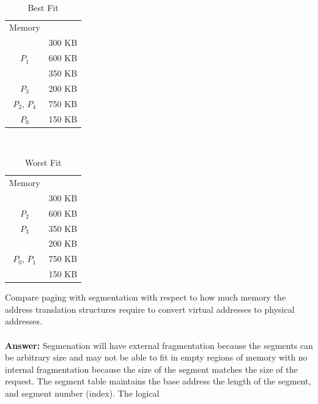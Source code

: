 \documentclass[12pt]{article}
\begin{document}
\\
\begin{table}[htb]
\centering
\caption{Best Fit}
\begin{tabular}{|c|c}
\cline{1-1}
Memory      &                               \\ \cline{1-1}
       & 300 KB                        \\ \cline{1-1}
$P_1$       & 600 KB                        \\ \cline{1-1}
       & 350 KB                        \\ \cline{1-1}
$P_3$            & 200 KB                        \\ \cline{1-1}
$P_2$, $P_4$       & 750 KB                        \\ \cline{1-1}
$P_0$            & 150 KB                        \\ \cline{1-1}
\end{tabular}
\end{table}
\\
\begin{table}[htb]
\centering
\caption{Worst Fit}
\begin{tabular}{|c|c}
\cline{1-1}
Memory      &                               \\ \cline{1-1}
       & 300 KB                        \\ \cline{1-1}
$P_2$       & 600 KB                        \\ \cline{1-1}
$P_3$      & 350 KB                        \\ \cline{1-1}
            & 200 KB                        \\ \cline{1-1}
$P_0$, $P_1$       & 750 KB                        \\ \cline{1-1}
            & 150 KB                        \\ \cline{1-1}
\end{tabular}
\end{table}
\FloatBarrier
{} Compare paging with segmentation with respect to how much memory
the address translation structures require to convert virtual addresses to
physical addresses.
\\\\
\textbf{Answer: }Segmenation will have external fragmentation because the segments 
can be arbitrary size and may not be able to fit in empty regions of memory with no internal 
fragmentation because the size of the segment matches the size of the request. The segment table
maintains the base address the length of the segment, and segment number (index). The logical 
\end{document}
